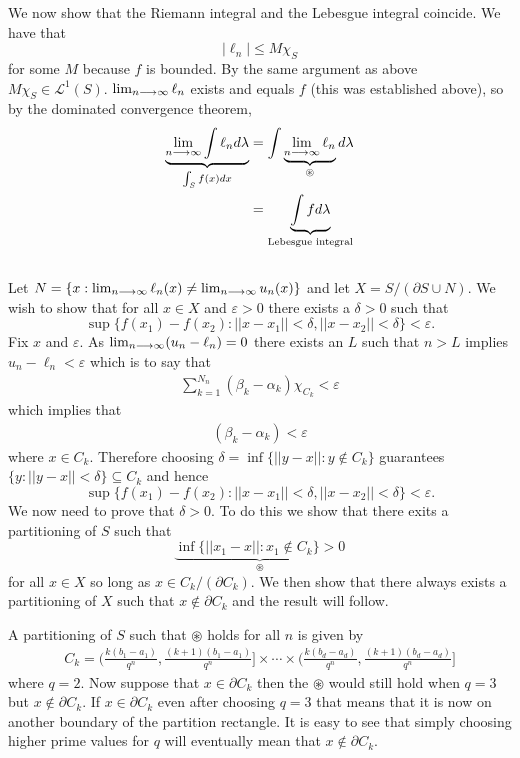 \documentclass{unswmaths}
\begin{document}
We now show that the Riemann integral and the Lebesgue integral coincide. 
We have that 
$$
    |\ell_n| \leq M \chi_{S} 
$$
for some $ M $ because $ f $ is bounded. By the same argument as above $ M \chi_{S} \in \mathcal{L}^1(S) $. $ \lim_{n\longrightarrow\infty} \ell_n $ exists and equals $ f $ (this was established above), so by the dominated convergence theorem,
\begin{align*}
    \underbrace{\lim_{n\longrightarrow\infty} \int \ell_n d\lambda}_{\int_{S} f(x) dx} &= \int \underbrace{\lim_{n\longrightarrow\infty} \ell_n}_{\circledast} d\lambda \\
    &= \underbrace{\int f d\lambda}_{\text{Lebesgue integral}} \\
\end{align*}

\subsection{}
Let $ N = \{ x : \lim_{n\longrightarrow\infty}\ell_n(x) \neq \lim_{n\longrightarrow\infty}u_n(x) \} $ and
let $ X = S / (\partial S \cup N ) $. 
We wish to show that for all $ x \in X $ and $ \varepsilon > 0 $ there exists a $ \delta > 0 $ such that
$$ \sup\{ f(x_1) - f(x_2) : ||x-x_1|| < \delta, ||x-x_2|| < \delta \} < \varepsilon. $$
Fix $ x $ and $ \varepsilon $. As $ \lim_{n\longrightarrow\infty} (u_n - \ell_n) = 0 $ there exists an $ L $ such that $ n > L $ implies $ u_n - \ell_n < \varepsilon $
which is to say that 
\begin{align*}
    \sum_{k=1}^{N_n} (\beta_k - \alpha_k) \chi_{C_k} < \varepsilon
\end{align*}
which implies that
\begin{align*}
    (\beta_k - \alpha_k) < \varepsilon
\end{align*}
where $ x \in C_k $. Therefore choosing $ \delta = \inf\{ ||y-x|| : y \not\in C_k \} $ guarantees
$ \{ y : ||y - x || < \delta \} \subseteq C_k $ and hence $$ \sup\{ f(x_1) - f(x_2) : ||x-x_1|| < \delta, ||x-x_2|| < \delta \} < \varepsilon. $$
We now need to prove that $ \delta > 0 $. To do this we show that there exits a partitioning of $ S $ such that $$ \underbrace{\inf\{ || x_1 - x || : x_1 \not\in C_k \} > 0}_{\circledast}$$ for all $ x \in X $ so long as $ x \in C_k / (\partial C_k ) $. We then show that there always exists a partitioning of $ X $ such that $ x \not\in \partial C_k $ and the result will follow. 

A partitioning of $ S $ such that $ \circledast $ holds for all $ n $ is given by
\begin{align*}
    C_k = \Big( \frac{k(b_1 - a_1)}{q^n}, \frac{(k+1)(b_1 - a_1)}{q^n}\Big] \times \cdots \times \Big( \frac{k(b_d-a_d)}{q^n}, \frac{(k+1)(b_d-a_d)}{q^n} \Big]
\end{align*}
where $ q = 2 $. Now suppose that $ x \in \partial C_k $ then the $ \circledast $ would still hold when $ q = 3 $ but $ x \not\in \partial C_k $. If $ x \in \partial C_k $ even after choosing $ q = 3 $ that means that it is now on another boundary of the partition rectangle. It is easy to see that simply choosing higher prime values for $ q $ will eventually mean that $ x \not\in \partial C_k $.
\end{document}
